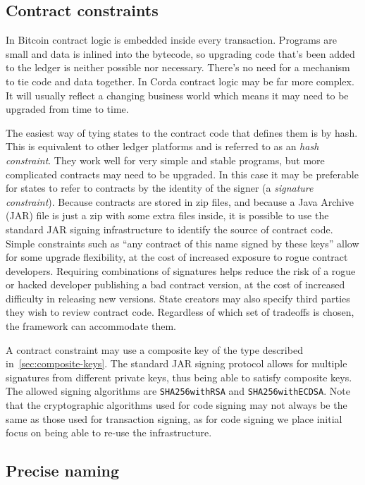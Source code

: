 \documentclass{article}
\begin{document}
\subsection{Contract constraints}\label{sec:contract-constraints}

In Bitcoin contract logic is embedded inside every transaction. Programs are small and data is inlined into the
bytecode, so upgrading code that's been added to the ledger is neither possible nor necessary. There's no need for
a mechanism to tie code and data together. In Corda contract logic may be far more complex. It will usually reflect
a changing business world which means it may need to be upgraded from time to time.

The easiest way of tying states to the contract code that defines them is by hash. This is equivalent to other
ledger platforms and is referred to as an \emph{hash constraint}. They work well for very simple and stable
programs, but more complicated contracts may need to be upgraded. In this case it may be preferable for states to
refer to contracts by the identity of the signer (a \emph{signature constraint}). Because contracts are stored in
zip files, and because a Java Archive (JAR) file is just a zip with some extra files inside, it is possible to use
the standard JAR signing infrastructure to identify the source of contract code. Simple constraints such as ``any
contract of this name signed by these keys'' allow for some upgrade flexibility, at the cost of increased exposure
to rogue contract developers. Requiring combinations of signatures helps reduce the risk of a rogue or hacked
developer publishing a bad contract version, at the cost of increased difficulty in releasing new versions. State
creators may also specify third parties they wish to review contract code. Regardless of which set of tradeoffs is
chosen, the framework can accommodate them.

A contract constraint may use a composite key of the type described in~\cref{sec:composite-keys}. The standard JAR
signing protocol allows for multiple signatures from different private keys, thus being able to satisfy composite
keys. The allowed signing algorithms are \texttt{SHA256withRSA} and \texttt{SHA256withECDSA}. Note that the
cryptographic algorithms used for code signing may not always be the same as those used for transaction signing, as
for code signing we place initial focus on being able to re-use the infrastructure.

\subsection{Precise naming}\label{subsec:precise-naming}
\end{document}
